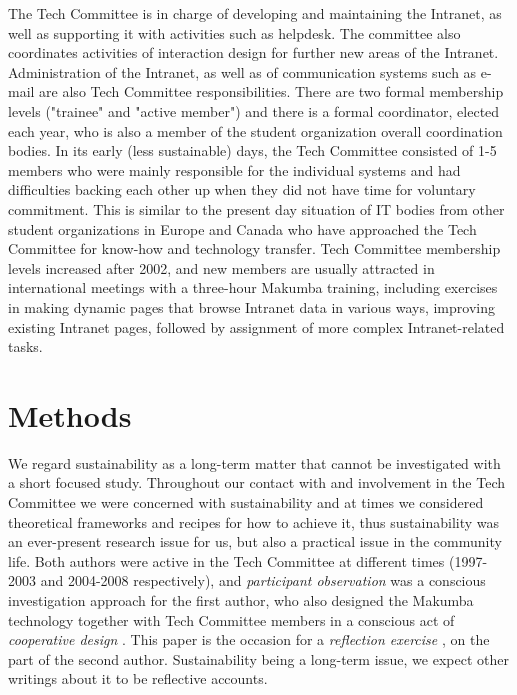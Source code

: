\documentclass{sig-alt-release2}
\begin{document}
The Tech Committee is in charge of developing and maintaining the Intranet, as well as supporting it with activities such as helpdesk. The committee also coordinates activities of interaction design for further new areas of the Intranet. Administration of the Intranet, as well as of communication systems such as e-mail are also Tech Committee responsibilities. There are two formal membership levels ("trainee" and "active member") and there is a formal coordinator, elected each year, who is also a member of the student organization overall coordination bodies. In its early (less sustainable) days, the Tech Committee consisted of 1-5 members who were mainly responsible for the individual systems and had difficulties backing each other up when they did not have time for voluntary commitment. This is similar to the present day situation of IT bodies from other student organizations in Europe and Canada who have approached the Tech Committee for know-how and technology transfer. Tech Committee membership levels increased after 2002, and new members are usually attracted in international meetings with a three-hour Makumba training, including exercises in making dynamic pages that browse Intranet data in various ways, improving existing Intranet pages, followed by assignment of more complex Intranet-related tasks.

\section{Methods}\label{sec:method}
We regard sustainability as a long-term matter that cannot be investigated with a short focused study. Throughout our contact with and involvement in the Tech Committee we were concerned with sustainability and at times we considered theoretical frameworks and recipes for how to achieve it, thus sustainability was an ever-present research issue for us, but also a practical issue in the community life. Both authors were active in the Tech Committee at different times (1997-2003 and 2004-2008 respectively), and {\it participant observation} was a conscious investigation approach for the first author, who also designed the Makumba technology together with Tech Committee members in a conscious act of {\it cooperative design} \cite{greenbaum_kyng91}. This paper is the occasion for a {\it reflection exercise} \cite{schon83}, on the part of the second author. Sustainability being a long-term issue, we expect other writings about it to be reflective accounts. 
\end{document}
